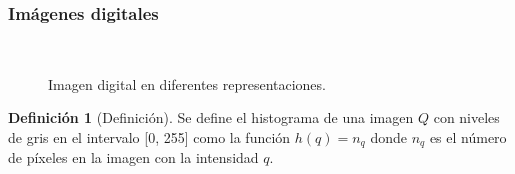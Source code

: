 \documentclass{beamer}
\theoremstyle{plain} %
\theoremstyle{definition}
\newtheorem{defn}{Definición}
\begin{document}
\begin{frame}
  \frametitle{Imágenes digitales}
  \begin{figure}
  \centering
    \quad
    \quad\
    \caption{Imagen digital en diferentes representaciones.}
    \label{fig:defimagen}
  \end{figure}

  \begin{defn}[Definición]
    Se define el histograma de una imagen $Q$ con niveles de gris en el intervalo [0, 255] como la función $h(q) = n_q$ donde $n_q$ es el número de píxeles en la imagen con la intensidad $q$.
  \end{defn}
\end{frame}
\end{document}
